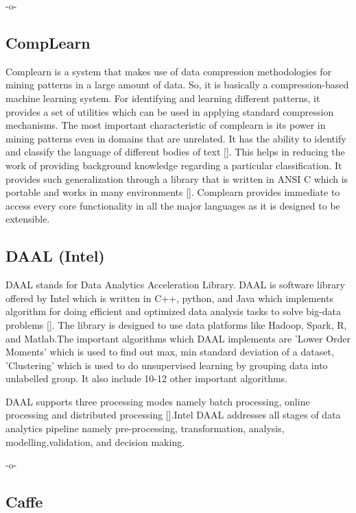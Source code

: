     -o-
    
\subsection{CompLearn}

Complearn is a system that makes use of data compression methodologies
for mining patterns in a large amount of data. So, it is basically a
compression-based machine learning system. For identifying and
learning different patterns, it provides a set of utilities which can
be used in applying standard compression mechanisms. The most
important characteristic of complearn is its power in mining patterns
even in domains that are unrelated. It has the ability to identify and
classify the language of different bodies of text [\cite{comp1}]. This
helps in reducing the work of providing background knowledge regarding
a particular classification. It provides such generalization through a
library that is written in ANSI C which is portable and works in many
environments [\cite{comp1}]. Complearn provides immediate to access
every core functionality in all the major languages as it is designed
to be extensible.

\subsection{DAAL (Intel)}

DAAL stands for Data Analytics Acceleration Library. DAAL is software
library offered by Intel which is written in C++, python, and Java
which implements algorithm for doing efficient and optimized data
analysis tasks to solve big-data problems [\cite{www-daal-wiki}]. The
library is designed to use data platforms like Hadoop, Spark, R, and
Matlab.The important algorithms which DAAL implements are 'Lower Order
Moments' which is used to find out max, min standard deviation of a
dataset, 'Clustering' which is used to do unsupervised learning by
grouping data into unlabelled group. It also include 10-12 other
important algorithms.

DAAL supports three processing modes namely batch processing, online
processing and distributed processing [\cite{www-daal-official}].Intel
DAAL addresses all stages of data analytics pipeline namely
pre-processing, transformation, analysis, modelling,validation, and
decision making.

    -o-
    
    
\subsection{Caffe}

